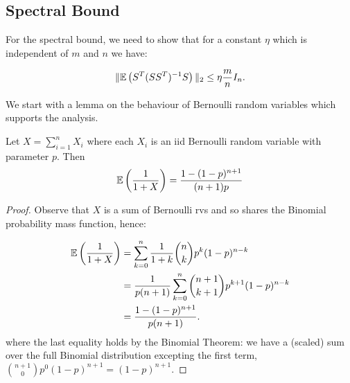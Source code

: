 \subsection{Spectral Bound}
For the spectral bound, we need to show that for a constant $\eta$
which is independent of $m$ and $n$ we have:

\begin{equation} \label{eq:spectral_bound}
  \| \mathbb{E} \left( S^T (S S^T)^{-1} S \right) \|_2 \le \eta \frac{m}{n} I_n.
\end{equation}

We start with a lemma on the behaviour of Bernoulli random variables
which supports the analysis. 

\begin{Lemma} \label{lem:exp_recip_bernoulli}
  Let $X = \sum_{i=1}^n X_i$ where each $X_i$ is an iid Bernoulli random variable with
  parameter $p$.
  Then
  \begin{equation}
    \mathbb{E} \left( \frac{1}{1+X} \right) = \frac{1 - (1-p)^{n+1}}{(n+1)p}
  \end{equation}
\end{Lemma}

\begin{proof}
  Observe that $X$ is a sum of Bernoulli rvs and so shares the Binomial probability
  mass function, hence:

  \begin{align}
    \mathbb{E} \left(  \frac{1}{1+X} \right) &= \sum_{k=0}^n \frac{1}{1+k}
                {n \choose k} p^k (1-p)^{n-k} \\
                &= \frac{1}{p(n+1)} \sum_{k=0}^n {n+1 \choose k+1} p^{k+1}
                (1-p)^{n-k} \\
                &= \frac{1 - (1-p)^{n+1}}{p(n+1)}.
  \end{align}
where the last equality holds by the Binomial Theorem: we have a
(scaled) sum over the full Binomial distribution excepting the first term,
${n+1 \choose 0} p^{0}(1-p)^{n+1} = (1-p)^{n+1}$. 


%
%
\end{proof}

